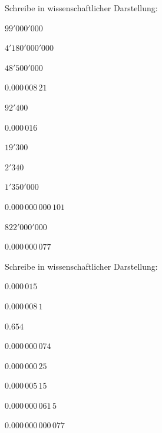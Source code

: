 \documentclass[%
11pt,%
twoside,%
titlepage,%
german,%
]{scrartcl}
\begin{document}
\begin{ueb}[factor]
  Schreibe in wissenschaftlicher Darstellung:
  \\[2.5ex]\hspace*{2.7ex}
  \begin{minipage}{0.4\textwidth}
    \begin{enumeratea}
      \item $99'000'000$
      \item $4'180'000'000$
      \item $48'500'000$
      \item $0.000\,008\,21$
      \item $92'400$
      \item $0.000\,016$\\[1ex]
    \end{enumeratea}
  \end{minipage}
  \begin{minipage}{0.4\textwidth}
    \begin{enumeratea}\addtocounter{enumi}{6}
      \item $19'300$
      \item $2'340$
      \item $1'350'000$
      \item $0.000\,000\,000\,101$
      \item $822'000'000$
      \item $0.000\,000\,077$\\[1ex]
    \end{enumeratea}
  \end{minipage}
\end{ueb}


\begin{ueb}[sci]
  Schreibe in wissenschaftlicher Darstellung:
  \\[2.5ex]\hspace*{2.7ex}
  \begin{minipage}{0.4\textwidth}
    \begin{enumeratea}
      \item $0.000\,015$
      \item $0.000\,008\,1$
      \item $0.654$
      \item $0.000\,000\,074$\\[1ex]
    \end{enumeratea}
  \end{minipage}
  \begin{minipage}{0.4\textwidth}
    \begin{enumeratea}\addtocounter{enumi}{4}
      \item $0.000\,000\,25$
      \item $0.000\,005\,15$
      \item $0.000\,000\,061\,5$
      \item $0.000\,000\,000\,077$\\[1ex]
    \end{enumeratea}
  \end{minipage}
\end{ueb}
\end{document}
